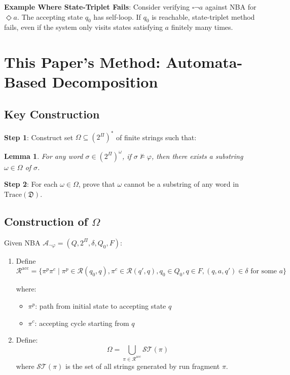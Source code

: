 \documentclass{article}
\newtheorem{lemma}{Lemma}
\begin{document}
\textbf{Example Where State-Triplet Fails}: Consider verifying $\square \neg a$ against NBA for $\Diamond a$. The accepting state $q_0$ has self-loop. If $q_0$ is reachable, state-triplet method fails, even if the system only visits states satisfying $a$ finitely many times.

\section{This Paper's Method: Automata-Based Decomposition}

\subsection{Key Construction}

\textbf{Step 1}: Construct set $\Omega \subseteq (2^\Pi)^*$ of finite strings such that:
\begin{lemma}
For any word $\sigma \in (2^\Pi)^\omega$, if $\sigma \not\models \varphi$, then there exists a substring $\omega \in \Omega$ of $\sigma$.
\end{lemma}

\textbf{Step 2}: For each $\omega \in \Omega$, prove that $\omega$ cannot be a substring of any word in $\text{Trace}(\mathfrak{D})$.

\subsection{Construction of $\Omega$}

Given NBA $\mathcal{A}_{\neg\varphi} = (Q, 2^\Pi, \delta, Q_0, F)$:

\begin{enumerate}
    \item Define $\mathcal{R}^{\text{acc}} = \{\pi^p \pi^c \mid \pi^p \in \mathcal{R}(q_0, q), \pi^c \in \mathcal{R}(q', q), q_0 \in Q_0, q \in F, (q, a, q') \in \delta \text{ for some } a\}$

    where:
    \begin{itemize}
        \item $\pi^p$: path from initial state to accepting state $q$
        \item $\pi^c$: accepting cycle starting from $q$
    \end{itemize}

    \item Define:
    \begin{equation}
    \Omega = \bigcup_{\pi \in \mathcal{R}^{\text{acc}}} \mathcal{ST}(\pi)
    \end{equation}
    where $\mathcal{ST}(\pi)$ is the set of all strings generated by run fragment $\pi$.
\end{enumerate}
\end{document}
